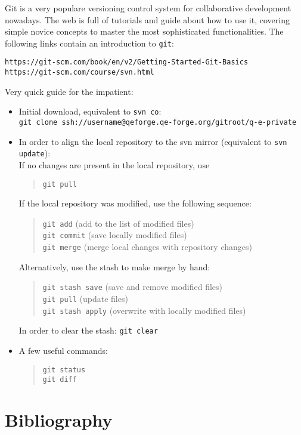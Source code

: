 \documentclass[12pt,a4paper]{article}
\begin{document}
Git is a very populare versioning control system for collaborative development 
nowadays. The web is full of tutorials and guide about how to use it, covering 
simple novice concepts to master the most sophisticated functionalities. The 
following links contain an introduction to \texttt{git}:
\begin{verbatim}
https://git-scm.com/book/en/v2/Getting-Started-Git-Basics
https://git-scm.com/course/svn.html
\end{verbatim}
Very quick guide for the impatient:
\begin{itemize}
\item Initial download, equivalent to \texttt{svn co}:\\
  \texttt{git clone ssh://username@qeforge.qe-forge.org/gitroot/q-e-private}
\item In order to align the local repository to the svn mirror
  (equivalent to \texttt{svn update}):\\
  If no changes are present in the local repository, use
  \begin{quote}
  \texttt{git pull}
  \end{quote}
  If the local repository was modified, use the following sequence:
  \begin{quote}
  \texttt{git add}     (add to the list of modified files)\\
  \texttt{git commit}  (save locally modified files)\\
  \texttt{git merge}   (merge local changes with repository changes)
  \end{quote}
  Alternatively, use the stash to make merge by hand:
  \begin{quote}
  \texttt{git stash save}     (save and remove modified files)\\
  \texttt{git pull}           (update files)\\
  \texttt{git stash apply}    (overwrite with locally modified files)
  \end{quote}
  In order to clear the stash:   \texttt{git clear}
\item A few useful commands:
  \begin{quote}
  \texttt{git status}\\
  \texttt{git diff}
  \end{quote}
\end{itemize}

\section{Bibliography}
\end{document}
